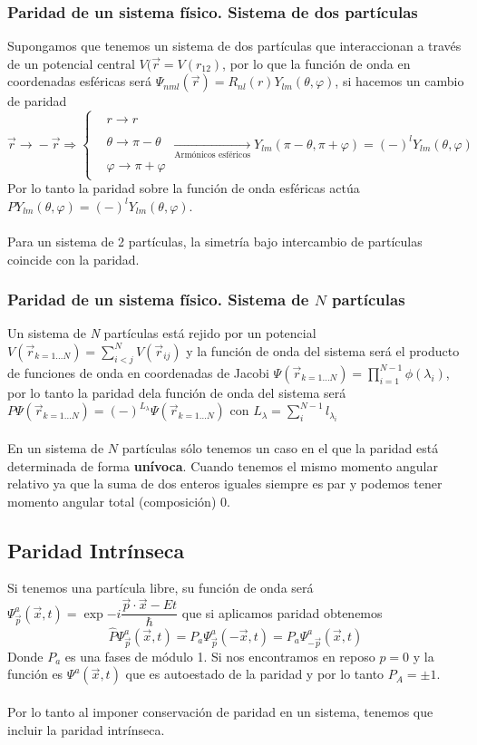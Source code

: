 \subsubsection{Paridad de un sistema físico. Sistema de dos partículas}
Supongamos que tenemos un sistema de dos partículas que interaccionan a través de un potencial central $    V(\vec{r}=V(r_{12})$, por lo que la función de onda en coordenadas esféricas será $ \Psi_{nml}(\vec{r})=R_{nl}(r)Y_{lm}(\theta,\varphi)$, si hacemos un cambio de paridad $$\vec{r}\xrightarrow[]{} -\vec{r} \Rightarrow \left \{ \begin{aligned}
    &r\xrightarrow[]{} r \\ &\theta \xrightarrow[]{} \pi-\theta\\ &\varphi \xrightarrow[]{} \pi+\varphi
\end{aligned} \right. \xrightarrow[\text{Armónicos esféricos}]{} Y_{lm}(\pi-\theta,\pi+\varphi)=(-)^{l} Y_{lm}(\theta,\varphi)$$
Por lo tanto la paridad sobre la función de onda esféricas actúa $PY_{lm}(\theta,\varphi)=(-)^l Y_{lm} (\theta,\varphi)$.\\\\
Para un sistema de 2 partículas, la simetría bajo intercambio de partículas coincide con la paridad.
\subsubsection{Paridad de un sistema físico. Sistema de $N$ partículas}
Un sistema de \textit{N} partículas está rejido por un potencial $V(\vec{r}_{k=1\dots N})= \displaystyle \sum_{i<j}^N V(\vec{r}_{ij})$ y la función de onda del sistema será el producto de funciones de onda en coordenadas de Jacobi $\Psi(\vec{r}_{k=1\dots N})=\displaystyle \prod^{N-1}_{i=1} \phi(\lambda_i)$, por lo tanto la paridad dela función de onda del sistema será $P\Psi(\vec{r}_{k=1\dots N})=(-)^{L_\lambda}\Psi (\vec{r}_{k=1\dots N})$ con $L_\lambda=\displaystyle {\sum_i^{N-1}l_{\lambda_i}}$\\\\
En un sistema de $N$ partículas sólo tenemos un caso en el que la paridad está determinada de forma \textbf{unívoca}. Cuando tenemos el mismo momento angular relativo ya que la suma de dos enteros iguales siempre es par y podemos tener momento angular total (composición) 0.
\subsection{Paridad Intrínseca}
Si tenemos una partícula libre, su función de onda será $\Psi^a_{\vec{p}} (\vec{x},t)=\exp{-i\dfrac{\vec{p}\cdot \vec{x}-Et}{\hbar}}$ que si aplicamos paridad obtenemos
\begin{equation*}
    \hat{P}\Psi^a_{\vec{p}} (\vec{x},t)= P_a \Psi^a_{\vec{p}} (-\vec{x},t)=P_a \Psi^a_{-\vec{p}} (\vec{x},t)
\end{equation*}
Donde $P_a$ es una fases de módulo 1. Si nos encontramos en reposo $p=0$ y la función es $\Psi^a (\vec{x},t)$ que es autoestado de la paridad y por lo tanto $P_A=\pm 1$.\\\\
Por lo tanto al imponer conservación de paridad en un sistema, tenemos que incluir la paridad intrínseca.

